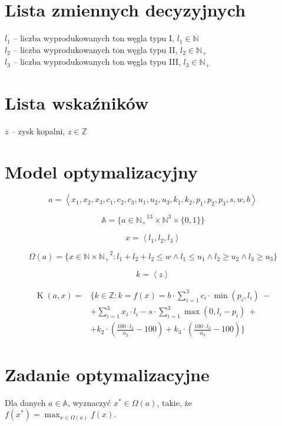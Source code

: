 \documentclass[titlepage]{article}
\begin{document}
\section{Lista zmiennych decyzyjnych}
$l_1$ -- liczba wyprodukowanych ton węgla typu I, $l_1 \in \mathbb{N}$ \\
$l_2$ -- liczba wyprodukowanych ton węgla typu II, $l_2 \in \mathbb{N_+}$ \\
$l_3$ -- liczba wyprodukowanych ton węgla typu III, $l_3 \in \mathbb{N_+}$

\section{Lista wskaźników}
$z$ -- zysk kopalni, $z \in \mathbb{Z}$

\section{Model optymalizacyjny}
\begin{equation}
	a = \left< x_1, x_2, x_3, c_1, c_2, c_3, u_1, u_2, u_3, k_1, k_2, p_1, p_2, p_3, s, w, b \right>
\end{equation}

\begin{equation}
	\mathbb{A} = \{ a \in \mathbb{N_+}^{13} \times \mathbb{N}^3 \times \{ 0, 1 \} \}
\end{equation}

\begin{equation}
	x = \left< l_1, l_2, l_3 \right>
\end{equation}

\begin{equation}
	\Omega(a) = \{ x \in \mathbb{N} \times \mathbb{N_+}^2 : l_1 + l_2 + l_2 \leq w \land l_1 \leq u_1 \land l_2 \geq u_2 \land l_3 \geq u_3 \}
\end{equation}

\begin{equation}
	k = \left< z \right>
\end{equation}

\begin{equation}
	\begin{aligned}
		\operatorname{K}(a, x) ={} & \{ k \in \mathbb{Z} : k = f(x) = b \cdot \sum_{i = 1}^3 c_i \cdot \min{(p_i, l_i)} \ -         \\
		                           & + \sum_{i = 1}^3 x_i \cdot l_i - s \cdot \sum_{i = 1}^3 \max{(0, l_i - p_i)} \ +               \\
		                           & + k_2 \cdot (\frac{100 \cdot l_2}{u_2} - 100) + k_3 \cdot (\frac{100 \cdot l_3}{u_3} - 100) \} 
	\end{aligned}
\end{equation}

\section{Zadanie optymalizacyjne}
Dla danych $a \in \mathbb{A}$, wyznaczyć $x^* \in \Omega(a)$, takie, że $f(x^*) = \max_{x \in \Omega(a)}{f(x)}$.
\end{document}
